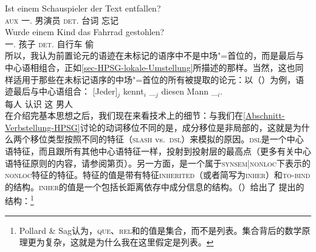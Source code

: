 \ex 
\gll Ist einem Schauspieler der Text entfallen?\\
      \textsc{aux}  一.\dat{} 男演员     \textsc{det}.\nom{} 台词 忘记\\
\ex
\gll Wurde einem Kind das Fahrrad gestohlen?\\
     \passivepst{} 一.\dat{} 孩子 \textsc{det}.\nom{} 自行车 偷\\
\zl
所以，我认为前置论元的语迹在未标记的语序中不是中场"=首位的，而是最后与中心语相组合，正如\ref{sec-HPSG-lokale-Umstellung}所描述的那样。当然，这也同样适用于那些在未标记语序的中场"=首位的所有被提取的论元：以（）为例，语迹最后与中心语组合：
\ea
\label{Beispiel-jeder-kennt-diesen-Mann-HPSG}
\gll {}[Jeder]$_j$ kennt$_i$ \_$_j$ diesen Mann \_$_i$.\\
	 {}\spacebr{}每人 认识 {} 这 男人\\
\z
在介绍完基本思想之后，我们现在来看技术上的细节：与我们在\ref{Abschnitt-Verbstellung-HPSG}讨论的动词移位不同的是，成分移位是非局部的，这就是为什么两个移位类型按照不同的特征（\textsc{slash} vs.\ \textsc{dsl}）来模拟的原因。\textsc{dsl}是一个中心语特征，而且跟所有其他中心语特征一样，投射到投射层的最高点（更多有关中心语特征原则的内容，请参阅第\pageref{prinzip-hfp}页）。另一方面，\slaschc 是一个属于\textsc{synsem|nonloc}下表示的\textsc{nonloc}特征的特征。\nonlocc 特征的值是带有特征\textsc{inherited}（或者简写为\textsc{inher}）和\textsc{to-bind}的结构。\textsc{inher}的值是一个包括长距离依存中成分信息的结构。（）给出了 \citet[]{ps2}提出的结构：\footnote{%
Pollard \& Sag认为，\textsc{que}、\textsc{rel}和\slaschc 的值是集合，而不是列表。集合背后的数学原理更为复杂，这就是为什么我在这里假定是列表。
}
